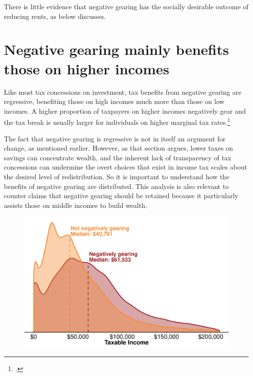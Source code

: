 \documentclass{grattanAlpha}\usepackage[]{graphicx}\usepackage[]{color}
\begin{document}
There is little evidence that negative gearing has the socially desirable outcome of reducing rents, as  below discusses.

\section{Negative gearing mainly benefits those on higher incomes}\label{NG-benefits-those-on-higher-incomes}
Like most tax concessions on investment, tax benefits from negative gearing are regressive, benefiting those on high incomes much more than those on low incomes. A higher proportion of taxpayers on higher incomes negatively gear and the tax break is usually larger for individuals on higher marginal tax rates.\footcites{FinancialSystemsInquiry2015}{Grudnoff2015}

The fact that negative gearing is regressive is not in itself an argument for change, as mentioned earlier\DEVIATION{}. 
However, as that section argues, lower taxes on savings can concentrate wealth, and the inherent lack of transparency of tax concessions can undermine the overt choices that exist in income tax scales about the desired level of redistribution. 
So it is important to understand how the benefits of negative gearing are distributed. 
This analysis is also relevant to counter claims that negative gearing should be retained because it particularly assists those on middle incomes to build wealth. 

\begin{figure}

\includegraphics[width=\columnwidth]{CGT-NG-atlas//tx-inc-distr-by-NG-1}
\end{figure}
\end{document}
